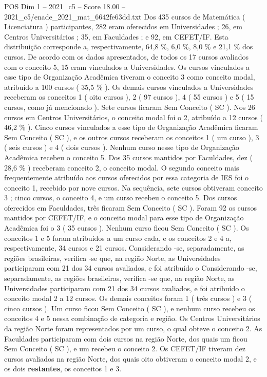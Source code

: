 \begin{textsample}{POS Dim 1 – 2021\_c5 – Score 18.00 – 2021\_c5/enade\_2021\_mat\_6642fe63dd.txt}
Dos 435 cursos de Matemática ( Licenciatura ) participantes, 282 eram oferecidos em Universidades ; 26, em Centros Universitários ; 35, em Faculdades ; e 92, em CEFET/IF.
Esta distribuição corresponde a, respectivamente, 64,8 \%, 6,0 \%, 8,0 \% e 21,1 \% dos cursos.
De acordo com os dados apresentados, de todos os 17 cursos avaliados com o conceito 5, 15 eram vinculados a Universidades.
Os cursos vinculados a esse tipo de Organização Acadêmica tiveram o conceito 3 como conceito modal, atribuído a 100 cursos ( 35,5 \% ).
Os demais cursos vinculados a Universidades receberam os conceitos 1 ( oito cursos ), 2 ( 97 cursos ), 4 ( 55 cursos ) e 5 ( 15 cursos, como já mencionado ).
Sete cursos ficaram Sem Conceito ( SC ).
Nos 26 cursos em Centros Universitários, o conceito modal foi o 2, atribuído a 12 cursos ( 46,2 \% ).
Cinco cursos vinculados a esse tipo de Organização Acadêmica ficaram Sem Conceito ( SC ), e os outros cursos receberam os conceitos 1 ( um curso ), 3 ( seis cursos ) e 4 ( dois cursos ).
Nenhum curso nesse tipo de Organização Acadêmica recebeu o conceito 5.
Dos 35 cursos mantidos por Faculdades, dez ( 28,6 \% ) receberam conceito 2, o conceito modal.
O segundo conceito mais frequentemente atribuído aos cursos oferecidos por essa categoria de IES foi o conceito 1, recebido por nove cursos.
Na sequência, sete cursos obtiveram conceito 3 ; cinco cursos, o conceito 4, e um curso recebeu o conceito 5.
Dos cursos oferecidos em Faculdades, três ficaram Sem Conceito ( SC ).
Foram 92 os cursos mantidos por CEFET/IF, e o conceito modal para esse tipo de Organização Acadêmica foi o 3 ( 35 cursos ).
Nenhum curso ficou Sem Conceito ( SC ).
Os conceitos 1 e 5 foram atribuídos a um curso cada, e os conceitos 2 e 4 a, respectivamente, 34 cursos e 21 cursos.
Considerando -se, separadamente, as regiões brasileiras, verifica -se que, na região Norte, as Universidades participaram com 21 dos 34 cursos avaliados, e foi atribuído o Considerando -se, separadamente, as regiões brasileiras, verifica -se que, na região Norte, as Universidades participaram com 21 dos 34 cursos avaliados, e foi atribuído o conceito modal 2 a 12 cursos.
Os demais conceitos foram 1 ( três cursos ) e 3 ( cinco cursos ).
Um curso ficou Sem Conceito ( SC ), e nenhum curso recebeu os conceitos 4 e 5 nessa combinação de categoria e região.
Os Centros Universitários da região Norte foram representados por um curso, o qual obteve o conceito 2.
As Faculdades participaram com dois cursos na região Norte, dos quais um ficou Sem Conceito ( SC ), e um recebeu o conceito 2.
Os CEFET/IF tiveram dez cursos avaliados na região Norte, dos quais oito obtiveram o conceito modal 2, e os dois \textbf{restantes}, os conceitos 1 e 3.

\end{textsample}
